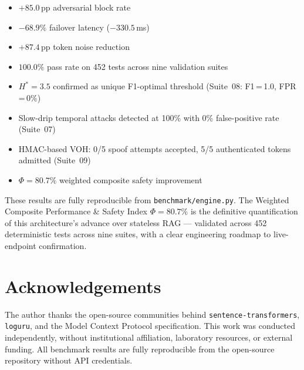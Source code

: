 \documentclass[11pt,twocolumn]{article}
\begin{document}
\begin{itemize}[leftmargin=*]
  \item $+85.0$\,pp adversarial block rate
  \item $-68.9\%$ failover latency ($-330.5$\,ms)
  \item $+87.4$\,pp token noise reduction
  \item $100.0\%$ pass rate on 452 tests across nine validation suites
  \item $H^{*}\!=\!3.5$ confirmed as unique F1-optimal threshold (Suite~08: F1\,=\,1.0, FPR\,=\,0\%)
  \item Slow-drip temporal attacks detected at 100\% with 0\% false-positive rate (Suite~07)
  \item HMAC-based VOH: 0/5 spoof attempts accepted, 5/5 authenticated tokens admitted (Suite~09)
  \item $\Phi = \mathbf{80.7\%}$ weighted composite safety improvement
\end{itemize}

These results are fully reproducible from \texttt{benchmark/engine.py}.
The Weighted Composite Performance \& Safety Index $\Phi = \mathbf{80.7\%}$
is the definitive quantification of this architecture's advance over
stateless RAG --- validated across 452 deterministic tests across nine suites,
with a clear engineering roadmap to live-endpoint confirmation.

\section*{Acknowledgements}
The author thanks the open-source communities behind
\texttt{sentence-transformers}, \texttt{loguru}, and the
Model Context Protocol specification.
This work was conducted independently, without institutional
affiliation, laboratory resources, or external funding. All benchmark
results are fully reproducible from the open-source repository without
API credentials.
\end{document}
